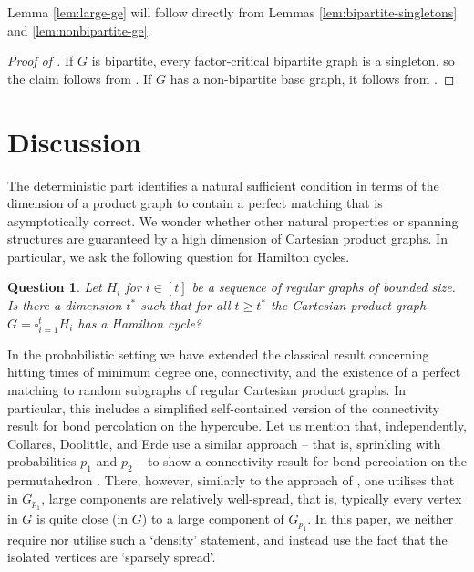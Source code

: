 \documentclass[10pt,a4paper]{article}
\newtheorem{question}[thm]{Question}
\begin{document}
Lemma \ref{lem:large-ge} will follow directly from Lemmas \ref{lem:bipartite-singletons} and \ref{lem:nonbipartite-ge}.

\begin{proof}[Proof of ]
If $G$ is bipartite, every factor-critical bipartite graph is a singleton, so the claim follows from .
If $G$ has a non-bipartite base graph, it follows from .
\end{proof}



\section{Discussion}\label{s:discussion}

The deterministic part identifies a natural sufficient condition in terms of the dimension of a product graph to contain a perfect matching that is asymptotically correct. We wonder whether other natural properties or spanning structures are guaranteed by a high dimension of Cartesian product graphs. In particular, we ask the following question for Hamilton cycles.
\begin{question}
    Let $H_i$ for $i \in [t]$ be a sequence of regular graphs of bounded size. Is there a dimension $t^*$ such that for all $t\geq t^*$ the Cartesian product graph $G=\square_{i=1}^t H_i$ has a Hamilton cycle?
\end{question}

In the probabilistic setting we have extended the classical result concerning hitting times of minimum degree one, connectivity, and the existence of a perfect matching to random subgraphs of regular Cartesian product graphs. In particular, this includes a simplified self-contained version of the connectivity result for bond percolation on the hypercube. Let us mention that, independently, Collares, Doolittle, and Erde use a similar approach -- that is, sprinkling with probabilities $p_1$ and $p_2$ -- to show a connectivity result for bond percolation on the permutahedron \cite{CDE24}. There, however, similarly to the approach of \cite{AKS81, BKL92, K23}, one utilises that in $G_{p_1}$, large components are relatively well-spread, that is, typically every vertex in $G$ is quite close (in $G$) to a large component of $G_{p_1}$. In this paper, we neither require nor utilise such a `density' statement, and instead use the fact that the isolated vertices are `sparsely spread'. 
\end{document}

